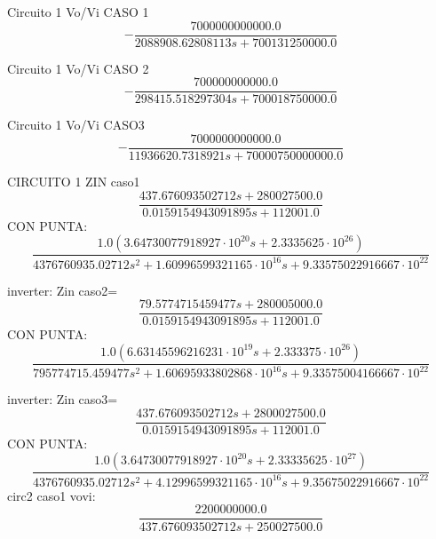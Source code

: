 Circuito 1 Vo/Vi CASO 1
\begin{equation}
- \frac{7000000000000.0}{2088908.62808113 s + 700131250000.0}
\end{equation}

Circuito 1 Vo/Vi CASO 2
\begin{equation}
- \frac{700000000000.0}{298415.518297304 s + 700018750000.0}
\end{equation}

Circuito 1 Vo/Vi CASO3
\begin{equation}
- \frac{7000000000000.0}{11936620.7318921 s + 70000750000000.0}
\end{equation}

CIRCUITO 1 ZIN
caso1
\begin{equation}
\frac{437.676093502712 s + 280027500.0}{0.0159154943091895 s + 112001.0}
\end{equation}
CON PUNTA:
\begin{equation}
\frac{1.0 \left(3.64730077918927 \cdot 10^{20} s + 2.3335625 \cdot 10^{26}\right)}{4376760935.02712 s^{2} + 1.60996599321165 \cdot 10^{16} s + 9.33575022916667 \cdot 10^{22}}
\end{equation}

inverter: Zin caso2=
\begin{equation}
\frac{79.5774715459477 s + 280005000.0}{0.0159154943091895 s + 112001.0}
\end{equation}
CON PUNTA:
\begin{equation}
\frac{1.0 \left(6.63145596216231 \cdot 10^{19} s + 2.333375 \cdot 10^{26}\right)}{795774715.459477 s^{2} + 1.60695933802868 \cdot 10^{16} s + 9.33575004166667 \cdot 10^{22}}
\end{equation}

inverter: Zin caso3=
\begin{equation}
\frac{437.676093502712 s + 2800027500.0}{0.0159154943091895 s + 112001.0}
\end{equation}
CON PUNTA:
\begin{equation}
\frac{1.0 \left(3.64730077918927 \cdot 10^{20} s + 2.33335625 \cdot 10^{27}\right)}{4376760935.02712 s^{2} + 4.12996599321165 \cdot 10^{16} s + 9.35675022916667 \cdot 10^{22}}
\end{equation}
circ2 caso1 vovi:
\begin{equation}
\frac{2200000000.0}{437.676093502712 s + 250027500.0}
\end{equation}


